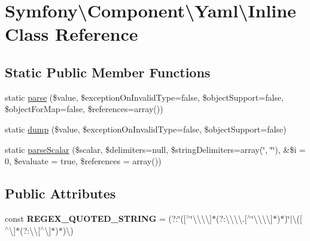 \hypertarget{classSymfony_1_1Component_1_1Yaml_1_1Inline}{}\section{Symfony\textbackslash{}Component\textbackslash{}Yaml\textbackslash{}Inline Class Reference}
\label{classSymfony_1_1Component_1_1Yaml_1_1Inline}
\subsection*{Static Public Member Functions}
\begin{DoxyCompactItemize}
\item 
static \hyperlink{classSymfony_1_1Component_1_1Yaml_1_1Inline_a13be4fe94060dfce9350c49ba10cbdfb}{parse} (\$value, \$exception\+On\+Invalid\+Type=false, \$object\+Support=false, \$object\+For\+Map=false, \$references=array())
\item 
static \hyperlink{classSymfony_1_1Component_1_1Yaml_1_1Inline_aae7fea23db45ed13c7419a3602000eeb}{dump} (\$value, \$exception\+On\+Invalid\+Type=false, \$object\+Support=false)
\item 
static \hyperlink{classSymfony_1_1Component_1_1Yaml_1_1Inline_ab1e18bcfcb90da8712c95a17952e3745}{parse\+Scalar} (\$scalar, \$delimiters=null, \$string\+Delimiters=array(\textquotesingle{}\char`\"{}\textquotesingle{}, \char`\"{}\textquotesingle{}\char`\"{}), \&\$i = 0, \$evaluate = true, \$references = array()) 
\end{DoxyCompactItemize}
\subsection*{Public Attributes}
\begin{DoxyCompactItemize}
\item 
const {\bfseries R\+E\+G\+E\+X\+\_\+\+Q\+U\+O\+T\+E\+D\+\_\+\+S\+T\+R\+I\+NG} = \textquotesingle{}(?\+:\char`\"{}(\mbox{[}$^\wedge$\char`\"{}\textbackslash{}\textbackslash{}\textbackslash{}\textbackslash{}\mbox{]}$\ast$(?\+:\textbackslash{}\textbackslash{}\textbackslash{}\textbackslash{}.\mbox{[}$^\wedge$\char`\"{}\textbackslash{}\textbackslash{}\textbackslash{}\textbackslash{}\mbox{]}$\ast$)$\ast$)\char`\"{}$\vert$\textbackslash{}\textquotesingle{}(\mbox{[}$^\wedge$\textbackslash{}\textquotesingle{}\mbox{]}$\ast$(?\+:\textbackslash{}\textquotesingle{}\textbackslash{}\textquotesingle{}\mbox{[}$^\wedge$\textbackslash{}\textquotesingle{}\mbox{]}$\ast$)$\ast$)\textbackslash{}\textquotesingle{})\textquotesingle{}\hypertarget{classSymfony_1_1Component_1_1Yaml_1_1Inline_aae5ffaaa70d1f6a86946048228c3a2fa}{}\label{classSymfony_1_1Component_1_1Yaml_1_1Inline_aae5ffaaa70d1f6a86946048228c3a2fa}

\end{DoxyCompactItemize}


